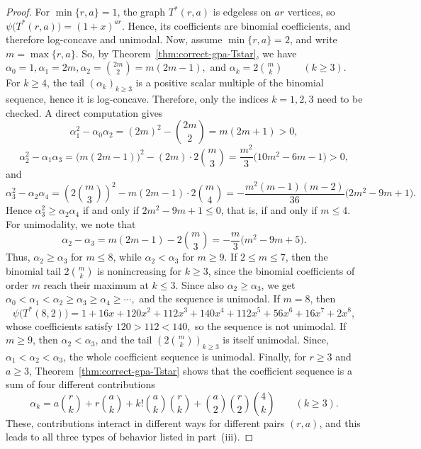 \documentclass[10pt,a4paper]{amsart}
\begin{document}
		\begin{proof}
			For $\min\{r,a\}=1$, the graph $T^*(r,a)$ is edgeless on $ar$ vertices, so $\psi\bigl(T^*(r,a)\bigr)=(1+x)^{ar}.$
			Hence, its coefficients are binomial coefficients, and therefore log-concave and unimodal. Now, assume $\min\{r,a\}=2$, and write $m=\max\{r,a\}$. So, by Theorem~\ref{thm:correct-gpa-Tstar}, we have
			$\alpha_0=1, \alpha_1=2m, \alpha_2=\binom{2m}{2}=m(2m-1),$	and $\alpha_k=2\binom{m}{k}\qquad (k\ge 3).$  For $k\ge 4$, the tail $(\alpha_k)_{k\ge 3}$ is a positive scalar multiple of the binomial sequence, hence it is log-concave. Therefore, only the indices $k=1,2,3$ need to be checked. A direct computation gives
			$$
			\alpha_1^2-\alpha_0\alpha_2
			=
			(2m)^2-\binom{2m}{2}
			=
			m(2m+1)>0,
			$$
			$$
			\alpha_2^2-\alpha_1\alpha_3
			=
			\bigl(m(2m-1)\bigr)^2-(2m)\cdot 2\binom{m}{3}
			=
			\frac{m^2}{3}\bigl(10m^2-6m-1\bigr)>0,
			$$
			and
			$$
			\alpha_3^2-\alpha_2\alpha_4
			=
			\left(2\binom{m}{3}\right)^2-m(2m-1)\cdot 2\binom{m}{4}
			=
			-\frac{m^2(m-1)(m-2)}{36}\bigl(2m^2-9m+1\bigr).
			$$
			Hence $\alpha_3^2\ge \alpha_2\alpha_4$ if and only if $2m^2-9m+1\le 0$, that is, if and only if $m\le 4$.  For unimodality, we note that 
			$$
			\alpha_2-\alpha_3
			=
			m(2m-1)-2\binom{m}{3}
			=
			-\frac{m}{3}\bigl(m^2-9m+5\bigr).
			$$
			Thus, $\alpha_2\ge \alpha_3$ for $m\le 8$, while $\alpha_2<\alpha_3$ for $m\ge 9$. If $2\le m\le 7$, then the binomial tail $2\binom{m}{k}$ is nonincreasing for $k\ge 3$, since the binomial coefficients of order $m$ reach their maximum at $k\le 3$. Since also $\alpha_2\ge \alpha_3$, we get $	\alpha_0<\alpha_1<\alpha_2\ge \alpha_3\ge \alpha_4\ge \cdots,
			$ and the sequence is unimodal. If $m=8$, then
			$$
			\psi\bigl(T^*(8,2)\bigr)=1+16x+120x^2+112x^3+140x^4+112x^5+56x^6+16x^7+2x^8,
			$$
			whose coefficients satisfy $120>112<140,$ so the sequence is not unimodal. If $m\ge 9$, then $\alpha_2<\alpha_3$, and the tail $(2\binom{m}{k})_{k\ge 3}$ is itself unimodal. Since, $\alpha_1<\alpha_2<\alpha_3$, the whole coefficient sequence is unimodal.  Finally, for $r\ge 3$ and $a\ge 3$,  Theorem~\ref{thm:correct-gpa-Tstar} shows that the coefficient sequence is a sum of four different contributions 
			$$
			\alpha_k
			=
			a\binom{r}{k}
			+
			r\binom{a}{k}
			+
			k!\binom{a}{k}\binom{r}{k}
			+
			\binom{a}{2}\binom{r}{2}\binom{4}{k}
			\qquad (k\ge 3).
			$$
			These, contributions interact in different ways for different pairs $(r,a)$, and this leads to all three types of behavior listed in part~(iii). 
		\end{proof}
\end{document}
